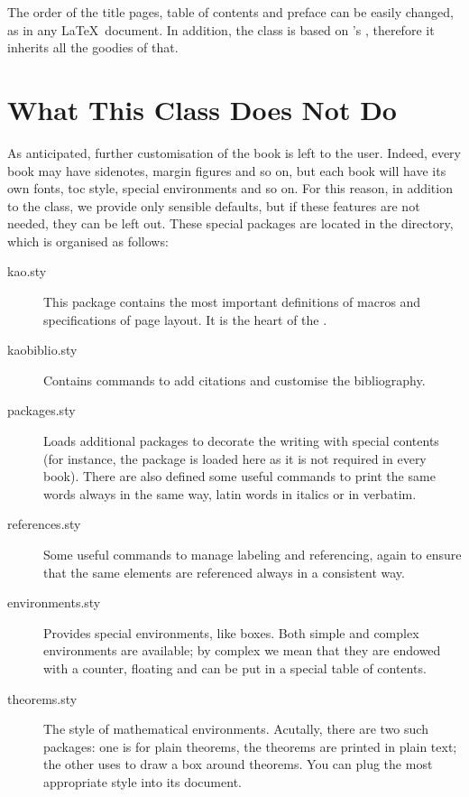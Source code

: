 The order of the title pages, table of contents and preface can be 
easily changed, as in any \LaTeX\ document. In addition, the class is 
based on \KOMAScript's , therefore it inherits all the 
goodies of that.

\section{What This Class Does Not Do}

As anticipated, further customisation of the book is left to the user. 
Indeed, every book may have sidenotes, margin figures and so on, but 
each book will have its own fonts, toc style, special environments and 
so on. For this reason, in addition to the class, we provide only 
sensible defaults, but if these features are not needed, they can be 
left out. These special packages are located in the  
directory, which is organised as follows:

\begin{description}
	\item[kao.sty] This package contains the most important definitions 
	of macros and specifications of page layout. It is the heart of the 
	.
	\item[kaobiblio.sty] Contains commands to add citations and 
	customise the bibliography.
	\item[packages.sty] Loads additional packages to decorate the 
	writing with special contents (for instance, the  
	package is loaded here as it is not required in every book). There 
	are also defined some useful commands to print the same words always 
	in the same way, \eg latin words in italics or  in 
	verbatim.
	\item[references.sty] Some useful commands to manage labeling and 
	referencing, again to ensure that the same elements are referenced 
	always in a consistent way.
	\item[environments.sty] Provides special environments, like boxes. 
	Both simple and complex environments are available; by complex we 
	mean that they are endowed with a counter, floating and can be put 
	in a special table of contents.
	\item[theorems.sty] The style of mathematical environments. 
	Acutally, there are two such packages: one is for plain theorems, 
	\ie the theorems are printed in plain text; the other uses 
	 to draw a box around theorems. You can plug the 
	most appropriate style into its document.
\end{description}

